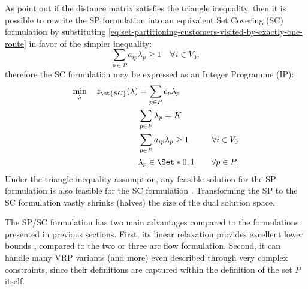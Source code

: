 As \textcite{toth2002} point out if the distance matrix satisfies the triangle inequality,
then it is possible to rewrite the SP formulation into an equivalent Set Covering (SC) formulation
by substituting \cref{eq:set-partitioning-customers-visited-by-exactly-one-route}
in favor of the simpler inequality:
\begin{equation}\label{eq:set-covering-customers-visited-by-exactly-one-route}
	\sum_{p \in P}  a_{ip} \lambda_p \ge 1  \quad \forall i \in V_0,
\end{equation}
therefore the SC formulation may be expressed as an Integer Programme (IP):
\begin{align}
	\min_{\lambda} \quad z_\mt{SC}(\lambda) & = \sum_{p \in P}  c_p \lambda_p              & \label{eq:set-covering-obj-func}                                                       \\
	                                        & \sum_{p \in P} \lambda_{p} = K               & \label{eq:set-covering-K-routes}                                                       \\
	                                        & \sum_{p \in P}  a_{ip} \lambda_p \ge 1       & \quad \forall i \in V_0 \label{eq:set-covering-customers-visited-by-exactly-one-route} \\
	                                        & \lambda_p                    \in \Set*{0, 1} & \quad \forall p \in P \label{eq:set-covering-lambda-mip-var-bounds}.
\end{align}
Under the triangle inequality assumption,
any feasible solution for the SP formulation
is also feasible for the SC formulation
.
Transforming the SP to the SC formulation vastly shrinks (halves) the size of the dual solution space.

\medskip

The SP/SC formulation has two main advantages compared to the formulations presented in previous sections.
First, its linear relaxation provides excellent lower bounds \parencite{bramel1997},
compared to the two or three arc flow formulation.
Second, it can handle many VRP variants (and more)
even described through very complex constraints,
since their definitions are captured within the definition of the set $P$ itself.
